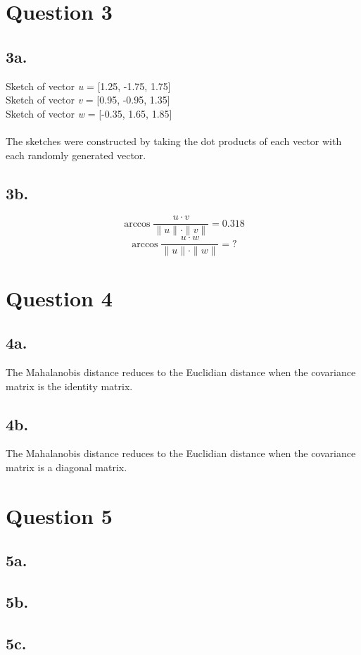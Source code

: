 \documentclass{article}
\begin{document}
\section{Question 3}

\subsection{3a.}
Sketch of vector \emph{u} = [1.25, -1.75, 1.75]\\
Sketch of vector \emph{v} = [0.95, -0.95, 1.35]\\
Sketch of vector \emph{w} = [-0.35, 1.65, 1.85]\\
\\The sketches were constructed by taking the dot products of each vector with each randomly generated vector.

\subsection{3b.}
\begin{equation}
\arccos \frac{u \cdot v}{\|u\| \cdot \|v\|} = 0.318
\end{equation}
\vspace{3mm}
\begin{equation}
\arccos \frac{u \cdot w}{\|u\| \cdot \|w\|} = ?
\end{equation}

\section{Question 4}

\subsection{4a.}
The Mahalanobis distance reduces to the Euclidian distance when the covariance matrix is the identity matrix.

\subsection{4b.}
The Mahalanobis distance reduces to the Euclidian distance when the covariance matrix is a diagonal matrix.

\section{Question 5}

\subsection{5a.}


\subsection{5b.}

\subsection{5c.}
\end{document}
